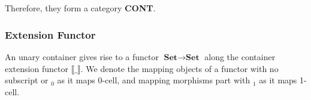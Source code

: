 {\begin{code}%
\>[0]\AgdaSpace{}%
\AgdaSymbol{:}\AgdaSpace{}%
\AgdaSpace{}%
\AgdaSpace{}%
\<%
\\
\>[0]\AgdaSpace{}%
\AgdaSymbol{=}\AgdaSpace{}%
\AgdaSpace{}%
\AgdaSpace{}%
\AgdaSpace{}%
\AgdaSpace{}%
\AgdaSpace{}%
\<%
\\
%
\\[\AgdaEmptyExtraSkip]%
\>[0]\AgdaSpace{}%
\AgdaSymbol{:}\AgdaSpace{}%
\AgdaSpace{}%
\AgdaSpace{}%
\AgdaSpace{}%
\AgdaSpace{}%
\AgdaSpace{}%
\AgdaSpace{}%
\AgdaSpace{}%
\AgdaSpace{}%
\AgdaSpace{}%
\AgdaSpace{}%
\<%
\\
\>[0]\AgdaSymbol{(}\AgdaSpace{}%
\AgdaSpace{}%
\AgdaSymbol{)}\AgdaSpace{}%
\AgdaSpace{}%
\AgdaSymbol{(}\AgdaSpace{}%
\AgdaSpace{}%
\AgdaSymbol{)}\AgdaSpace{}%
\AgdaSymbol{=}\AgdaSpace{}%
\AgdaSymbol{(}\AgdaSpace{}%
\AgdaSpace{}%
\AgdaSymbol{)}\AgdaSpace{}%
\AgdaSpace{}%
\AgdaSpace{}%
\AgdaSpace{}%
\AgdaSpace{}%
\AgdaSpace{}%
\AgdaSpace{}%
\AgdaSpace{}%
\AgdaSpace{}%
\AgdaSymbol{(}\AgdaSpace{}%
\AgdaSymbol{)}\<%
\end{code}

Therefore, they form a category \textbf{CONT}.

\subsubsection*{Extension Functor}

An unary container gives rise to a functor $\textbf{Set} \to \textbf{Set}$ along the container extension functor $\llbracket\_\rrbracket$. We denote the mapping objects of a functor with no subscript or $_0$ as it maps 0-cell, and mapping morphisms part with $_1$ as it maps 1-cell.

}
